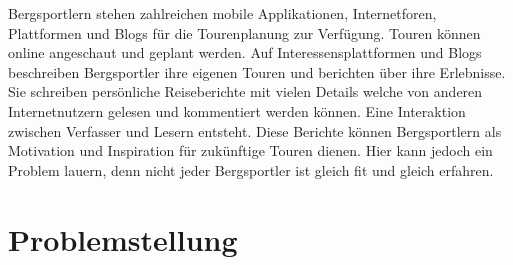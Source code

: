 Bergsportlern stehen zahlreichen mobile Applikationen, Internetforen, Plattformen und Blogs für die Tourenplanung zur Verfügung. Touren können online angeschaut und geplant werden. Auf Interessensplattformen und Blogs beschreiben Bergsportler ihre eigenen Touren und berichten über ihre  Erlebnisse. Sie schreiben persönliche Reiseberichte mit vielen Details welche von anderen Internetnutzern gelesen und kommentiert werden können. Eine Interaktion zwischen Verfasser und Lesern entsteht. Diese Berichte können Bergsportlern als Motivation und Inspiration für zukünftige Touren dienen. Hier kann jedoch ein Problem lauern, denn nicht jeder Bergsportler ist gleich fit und gleich erfahren.


\section{Problemstellung}

